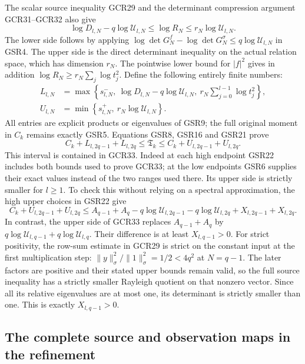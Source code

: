 The scalar source inequality GCR29 and the determinant
compression argument GCR31--GCR32 also give
\[
 \log D_{l,N}-q\log\mathscr U_{l,N}
    \leq\log R_N\leq r_N\log\mathscr U_{l,N}.
\tag{GSR21}
\]
The lower side follows by applying
$\log\det G_N^f-\log\det G_N^\sigma\leq
q\log\mathscr U_{l,N}$ in GSR4.
The upper side is the direct determinant inequality on the
actual relation space, which has dimension $r_N$.
The pointwise lower bound for $|f|^2$ gives in addition
$\log R_N\geq r_N\sum_j\log t_j^2$.
Define the following entirely finite numbers:
\[
\begin{split}
 L_{l,N}
 &=\max\left\{s^-_{l,N},\
     \log D_{l,N}-q\log\mathscr U_{l,N},\
                       r_N\sum_{j=0}^{l-1}\log t_j^2\right\},\\
 U_{l,N}
 &=\min\left\{s^+_{l,N},\
                         r_N\log\mathscr U_{l,N}\right\}.
\end{split}\tag{GSR22}
\]
All entries are explicit products or eigenvalues of GSR9;
the full original moment in $C_k$ remains exactly GSR5.
Equations GSR8, GSR16 and GSR21 prove
\[
 \boxed{\quad
 C_k+L_{l,2q-1}+L_{l,2q}
       \leq\mathfrak T_k
       \leq C_k+U_{l,2q-1}+U_{l,2q}.
 \quad}\tag{GSR23}
\]
This interval is contained in GCR33. Indeed at each high
endpoint GSR22 includes both bounds used to prove GCR33;
at the low endpoints GSR6 supplies their exact values instead
of the two ranges used there.
Its upper side is strictly smaller for $l\geq1$.
To check this without relying on a spectral approximation,
the high upper choices in GSR22 give
\[
 C_k+U_{l,2q-1}+U_{l,2q}
 \leq A_{q-1}+A_q
       -q\log\mathscr U_{l,2q-1}
       -q\log\mathscr U_{l,2q}
       +X_{l,2q-1}+X_{l,2q}.
\]
In contrast, the upper side of GCR33 replaces
$A_{q-1}+A_q$ by
$q\log\mathscr U_{l,q-1}+q\log\mathscr U_{l,q}$.
Their difference is at least $X_{l,q-1}>0$.
For strict positivity, the row-sum estimate in GCR29 is strict
on the constant input at the first multiplication step:
$\|y\|_\sigma^2/\|1\|_\sigma^2=1/2<4q^2$ at $N=q-1$.
The later factors are positive and their stated upper bounds
remain valid, so the full source inequality has a strictly
smaller Rayleigh quotient on that nonzero vector.
Since all its relative eigenvalues are at most one, its
determinant is strictly smaller than one. This is exactly
$X_{l,q-1}>0$.

\subsection{The complete source and observation maps in the refinement}

